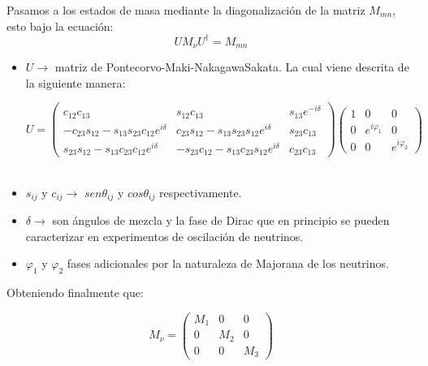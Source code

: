 \documentclass[12pt]{article}
\begin{document}
Pasamos a los estados de masa mediante la diagonalización de la
matriz \( M_{mn} \), esto bajo la ecuación: 
\begin{equation}
   UM_\nu U^\dagger= M_{mn}
\label{eq:23}
\end{equation}

\begin{itemize}
\item \( U \rightarrow \) matriz de Pontecorvo-Maki-NakagawaSakata. La cual viene descrita de la siguiente manera:

\begin{equation}
        U =  \begin{pmatrix}    c_{12}c_{13} & s_{12}c_{13} & s_{13}e^{-i\delta} \\
         -c_{23}s_{12}-s_{13}s_{23}c_{12}e^{i\delta} &  c_{23}s_{12}-s_{13}s_{23}s_{12}e^{i\delta} & s_{23}c_{13}  \\
         s_{23}s_{12}-s_{13}c_{23}c_{12}e^{i\delta} &  -s_{23}c_{12}-s_{13}c_{23}s_{12}e^{i\delta} & c_{23}c_{13}  \end{pmatrix} \begin{pmatrix}   1 & 0 & 0 \\
         0 &  e^{i\varphi_1} & 0  \\
        0 &  0 & e^{i\varphi_2}  \end{pmatrix}
       \label{eq:24}  
\end{equation} \\

\item \( s_{ij}\) y \(c_{ij} \rightarrow \) \( sen\theta_{ij}  \) y \( cos\theta_{ij}  \) respectivamente. 
\item \(\delta \rightarrow \)  son ángulos de mezcla y la fase de
Dirac que en principio se pueden caracterizar en experimentos de oscilación de neutrinos.

\item \(\varphi_1 \) y \(\varphi_2 \) fases adicionales por la naturaleza de Majorana de los neutrinos. 

\end{itemize}

Obteniendo finalmente que: 
 
\begin{equation}
    M_\nu=  \begin{pmatrix} M_1& 0 & 0  \\ 0 & M_2 & 0 \\ 0 &0 & M_3   \end{pmatrix} 
\end{equation} \\
\end{document}
